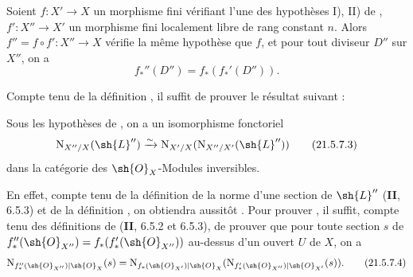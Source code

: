 \begin{proposition}[21.5.7]
\label{IV.21.5.7}
Soient $f:X'\to X$ un morphisme fini vérifiant l'une des hypothèses I), II) de , $f':X''\to X'$ un morphisme fini localement libre de rang constant $n$.
Alors $f''=f\circ f':X''\to X$ vérifie la même hypothèse que $f$, et pour tout diviseur $D''$ sur $X''$, on a
\[
\label{IV.21.5.7.1}
  f_*''(D'')=f_*(f_*'(D'')).
  \tag{21.5.7.1}
\]
\end{proposition}

Compte tenu de la définition , il suffit de prouver le résultat suivant :

\begin{lemma}[21.5.7.2]
\label{IV.21.5.7.2}
Sous les hypothèses de , on a un isomorphisme fonctoriel
\[
\label{IV.21.5.7.3}
  \mathrm{N}_{X''/X}(\sh{L}'')\xrightarrow{\sim}\mathrm{N}_{X'/X}(\mathrm{N}_{X''/X'}(\sh{L}''))
  \tag{21.5.7.3}
\]
dans la catégorie des $\sh{O}_X$-Modules inversibles.
\end{lemma}

En effet, compte tenu de la définition de la norme d'une section de $\sh{L}''$ (\textbf{II}, 6.5.3) et de la définition , on obtiendra aussitôt .
Pour prouver , il suffit, compte tenu des définitions de (\textbf{II}, 6.5.2 et 6.5.3), de prouver que pour toute section $s$ de $f_*''(\sh{O}_{X''})=f_*(f_*'(\sh{O}_{X''}))$ au-dessus d'un ouvert $U$ de $X$, on a
\[
\label{IV.21.5.7.4}
  \mathrm{N}_{f_*''(\sh{O}_{X''})|\sh{O}_X}(s)=\mathrm{N}_{f_*(\sh{O}_{X'})|\sh{O}_X}(\mathrm{N}_{f_*'(\sh{O}_{X''})|\sh{O}_{X'}}(s)).
  \tag{21.5.7.4}
\]

